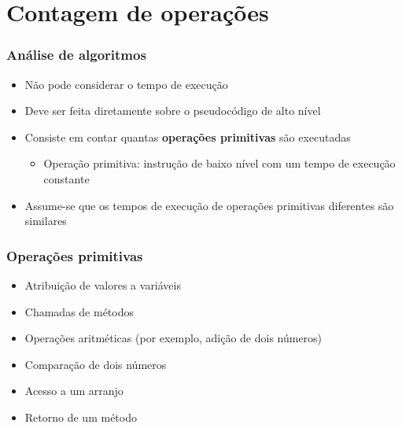 \documentclass[aspectratio=169]{beamer}
\begin{document}
\section{Contagem de operações}


\begin{frame}\frametitle{Análise de algoritmos}
\begin{itemize}
	\item Não pode considerar o tempo de execução
	\item Deve ser feita diretamente sobre o pseudocódigo de alto nível
	\item Consiste em contar quantas \textbf{operações primitivas} são executadas
	\begin{itemize}
		\item Operação primitiva: instrução de baixo nível com um tempo de execução constante
	\end{itemize}
	\item Assume-se que os tempos de execução de operações primitivas diferentes são similares
\end{itemize}
\end{frame}

\begin{frame}\frametitle{Operações primitivas}
\begin{itemize}
	\item Atribuição de valores a variáveis
	\item Chamadas de métodos
	\item Operações aritméticas (por exemplo, adição de dois números)
	\item Comparação de dois números
	\item Acesso a um arranjo
	\item Retorno de um método
\end{itemize}
\end{frame}
\end{document}
